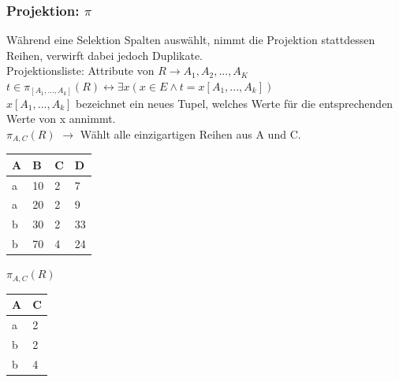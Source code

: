 \documentclass{article}
\begin{document}
 	\subsubsection{Projektion: \texorpdfstring{$\pi$}{}}
 	Während eine Selektion Spalten auswählt, nimmt die Projektion stattdessen Reihen, verwirft dabei jedoch Duplikate. \\
 	Projektionsliste: Attribute von $R \rightarrow A_1, A_2, ..., A_K$ \\
 	$t\in \pi_{[A_1,...,A_k]}(R)\leftrightarrow \exists x(x\in E\land t=x[A_1,...,A_k])$ \\
 	$x[A_1, ..., A_k]$ bezeichnet ein neues Tupel, welches Werte für die entsprechenden Werte von x annimmt. \\
 	$\pi_{A,C}(R)$ $\to$ Wählt alle einzigartigen Reihen aus A und C. \\
 	 \begin{tabular}{| l | l | l | l |}
 		\toprule
 		A & B & C & D \\ \midrule
 		a & 10 & 2 & 7 \\ \hline
 		a & 20 & 2 & 9 \\ \hline
 		b & 30 & 2 & 33 \\ \hline
 		b & 70 & 4 & 24 \\
 		\bottomrule
 	\end{tabular} \hspace{0.5cm}
 	$\pi_{A,C}(R)$
 	\begin{tabular}{| l | l |}
 		\toprule
 		A & C  \\ \midrule
 		a & 2  \\
 		b & 2 \\
 		b & 4 \\
 		\bottomrule
 	\end{tabular}
\end{document}
